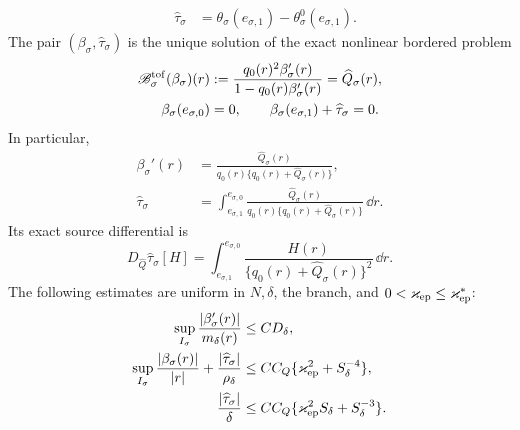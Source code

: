 \begin{theorem}
\begin{align}
 &
 \widehat\tau_\sigma
 &=\theta_\sigma(e_{\sigma,1})
       -\theta_\sigma^0(e_{\sigma,1}).            \label{eq:receding-flight-coordinates}
\end{align}
The pair \((\beta_\sigma,\widehat\tau_\sigma)\) is the unique solution of
the exact nonlinear bordered problem
\begin{align}
 \mathscr B_{\sigma}^{\rm tof}(\beta_\sigma)(r)
 &:=\frac{q_0(r)^2\beta_\sigma'(r)}
          {1-q_0(r)\beta_\sigma'(r)}
   =\widehat Q_\sigma(r),\notag\\
 \beta_\sigma(e_{\sigma,0})&=0,\qquad
 \beta_\sigma(e_{\sigma,1})
       +\widehat\tau_\sigma=0.                   \label{eq:receding-flight-bordered-problem}
\end{align}
In particular,
\begin{align}
 \beta_\sigma'(r)
 &=\frac{\widehat Q_\sigma(r)}
       {q_0(r)\{q_0(r)+\widehat Q_\sigma(r)\}},
                                                        \label{eq:receding-flight-beta-prime}\\
 \widehat\tau_\sigma
 &=\int_{e_{\sigma,1}}^{e_{\sigma,0}}
    \frac{\widehat Q_\sigma(r)}
       {q_0(r)\{q_0(r)+\widehat Q_\sigma(r)\}}\,\dd r.
                                                        \label{eq:receding-flight-duration}
\end{align}
Its exact source differential is
\begin{equation}
 D_{\widehat Q}\widehat\tau_\sigma[H]
 =\int_{e_{\sigma,1}}^{e_{\sigma,0}}
       \frac{H(r)}
        {\{q_0(r)+\widehat Q_\sigma(r)\}^2}\,\dd r.
                                                        \label{eq:receding-flight-duration-differential}
\end{equation}
The following estimates are uniform in \(N,\delta\), the branch, and
\(0<\varkappa_{\rm ep}\le\varkappa_{\rm ep}^*\):
\begin{align}
 \sup_{I_\sigma}
   \frac{|\beta_\sigma'(r)|}{m_\delta(r)}
 &\le CD_\delta,\notag\\
 \sup_{I_\sigma}\frac{|\beta_\sigma(r)|}{|r|}
   +\frac{|\widehat\tau_\sigma|}{\rho_\delta}
 &\le C C_Q\{\varkappa_{\rm ep}^2+S_\delta^{-4}\},
                                                        \label{eq:receding-flight-relative-bounds}\\
 \frac{|\widehat\tau_\sigma|}{\delta}
 &\le C C_Q\{\varkappa_{\rm ep}^2S_\delta
                         +S_\delta^{-3}\}.        \label{eq:receding-flight-fold-time-bound}
\end{align}


\end{theorem}
